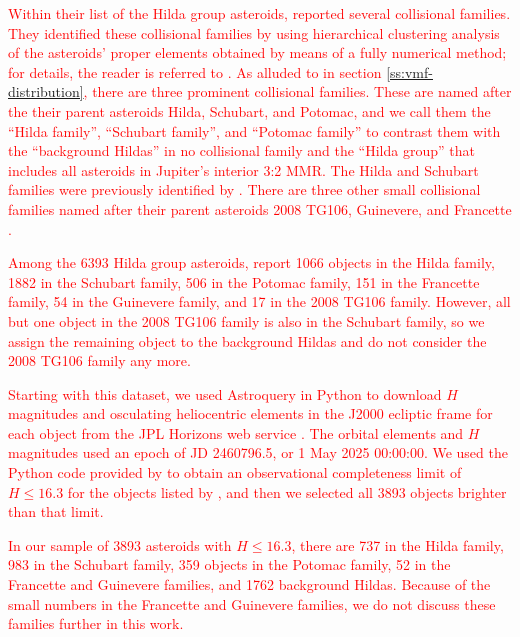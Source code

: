 \documentclass[a4paper,fleqn]{cas-sc}
\begin{document}
\begin{linenumbers}
\textcolor{red}{
Within their list of the Hilda group asteroids, \cite{vokrouhlicky2025orbital} reported several collisional families.
They identified these collisional families by using hierarchical clustering analysis of the asteroids' proper elements obtained by means of a fully numerical method; for details, the reader is referred to \citet[][Appendix C]{vokrouhlicky2025orbital}.
\textcolor{red}{As alluded to in section \ref{ss:vmf-distribution},}
there are three prominent collisional families.
These are named \textcolor{red}{after the} their parent asteroids Hilda, Schubart, and Potomac,
\textcolor{red}{
and we call them the ``Hilda family'', ``Schubart family'', and ``Potomac family'' to contrast them with the ``background Hildas'' in no collisional family and the ``Hilda group'' that includes all asteroids in Jupiter's interior 3:2 MMR.
The Hilda and Schubart families were previously identified by \citet{brovz2011did,schubart1982numerical,schubart1982three}.
}
There are three other small collisional families  named after their parent asteroids 2008 TG106, Guinevere, and Francette \citep{vokrouhlicky2025orbital}.
}

\textcolor{red}{Among the 6393 Hilda group asteroids, \citet{vokrouhlicky2025orbital} report 1066 objects in the Hilda family,
1882 in the Schubart family,
506 in the Potomac family,
151 in the Francette family,
54 in the Guinevere family,
and 17 in the 2008 TG106 family.
However, all but one object in the 2008 TG106 family is also in the Schubart family, so we assign the remaining object to the background Hildas and do not consider the 2008 TG106 family any more.}


\textcolor{red}{
Starting with this dataset, we used Astroquery in Python to download $H$ magnitudes and osculating heliocentric elements in the J2000 ecliptic frame for each object from the JPL Horizons web service \citep{jpl_horizons}.
The orbital elements and $H$ magnitudes used an epoch of JD 2460796.5, or 1 May 2025 00:00:00.
We used the Python code provided by \citet{hendler2020observational} to obtain an observational completeness limit of $H\leq16.3$ for the objects listed by \citet{vokrouhlicky2025orbital}, and then we selected all 3893 objects brighter than that limit.}

\textcolor{red}{
In our sample of \textcolor{red}{3893} asteroids with \textcolor{red}{$H\leq16.3$}, there are
\textcolor{red}{737} in the Hilda family, 
\textcolor{red}{983} in the Schubart family, 
\textcolor{red}{359} objects in the Potomac family, 
\textcolor{red}{52} in the Francette and Guinevere families,
and \textcolor{red}{1762} background Hildas.
Because of the small numbers in the Francette \textcolor{red}{and} Guinevere families, we do not discuss these families further in this work.
}




\end{linenumbers}
\end{document}
